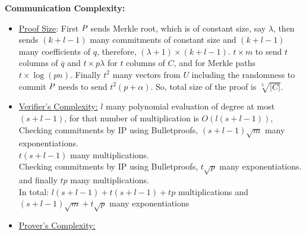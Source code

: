 \textbf{Communication Complexity:}
\begin{itemize}
	\item \underline{Proof Size}: First $\P$ sends Merkle root, which is of constant size, say $\lambda$,  then sends $(k+l-1)$ many commitments of constant size and $(k+l-1)$ many coefficients of $q$, therefore, $(\lambda+1)\times (k+l-1)$. $t\times m$ to send $t$ columns of $\overline{q}$ and $t \times p\lambda$ for $t$ columns of $C$, and for Merkle paths $t \times \log (pn)$. Finally $t^2$ many vectors from $U$ including the randomness to commit $\P$ needs to send $t^2(p+\alpha)$. So, total size of the proof is $\sqrt[3]{|C|}$.
	\item \underline{Verifier's Complexity:} $l$ many polynomial evaluation of degree at most $(s+l-1)$, for that number of multiplication is $O(l(s+l-1))$,\\
	Checking commitments by IP using Bulletproofs, $(s+l-1)\sqrt{m}$ many exponentiations.\\
	$t(s+l-1)$ many multiplications.\\
	Checking commitments by IP using Bulletproofs, $t\sqrt{p}$ many exponentiations.\\
	and finally $tp$ many multiplications.\\
	In total: $l(s+l-1)+t(s+l-1)+tp$ multiplications and $(s+l-1)\sqrt{m}+t\sqrt{p}$ many exponentiations
	
	\item \underline{Prover's Complexity:}
	
\end{itemize}

